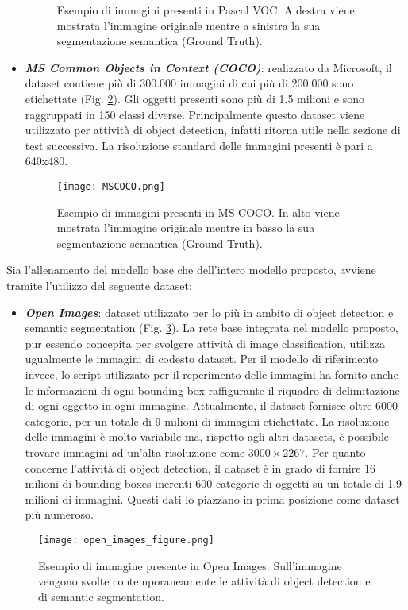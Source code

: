 \begin{itemize}
\begin{figure}
        \caption{Esempio di immagini presenti in Pascal VOC. A destra viene mostrata l'immagine originale mentre a sinistra la sua segmentazione semantica (Ground Truth).}
        \label{pascal}
    \end{figure} 
    \item {\bfseries{\emph{MS Common Objects in Context (COCO)}}}\cite{COCO}: realizzato da 
    Microsoft, il dataset contiene più di 300.000 immagini di cui più di 
    200.000 sono etichettate (Fig. \ref{MSCOCO_dataset}). Gli oggetti presenti sono più di 
    1.5 milioni e sono raggruppati in 150 classi diverse. Principalmente 
    questo dataset viene utilizzato per attività di object detection, infatti 
    ritorna utile nella sezione di test successiva. La risoluzione standard 
    delle immagini presenti è pari a 640x480.
    \begin{figure}
        \centering
        \texttt{[image: MSCOCO.png]}
        \centering
        \caption{Esempio di immagini presenti in MS COCO. In alto viene mostrata l'immagine originale mentre in basso la sua segmentazione semantica (Ground Truth).}
        \label{MSCOCO_dataset}
    \end{figure} 
\end{itemize}
Sia l'allenamento del modello base che dell'intero modello proposto, avviene 
tramite l'utilizzo del seguente dataset:
\begin{itemize}
    \item {\bfseries{\emph{Open Images}}}\cite{OpenImages2}: dataset utilizzato per lo più in ambito di object 
    detection e semantic segmentation (Fig. \ref{openimages_dataset}). La rete base integrata 
    nel modello proposto, pur essendo concepita per svolgere attività 
    di image classification, utilizza ugualmente le immagini di codesto 
    dataset. Per il modello di riferimento invece, lo script utilizzato per il 
    reperimento delle immagini ha fornito anche le informazioni di ogni 
    bounding-box raffigurante il riquadro di delimitazione di ogni oggetto 
    in ogni immagine. Attualmente, il dataset fornisce oltre 6000 categorie, 
    per un totale di 9 milioni di immagini etichettate. La risoluzione delle 
    immagini è molto variabile ma, rispetto agli altri datasets, è possibile 
    trovare immagini ad un'alta risoluzione come $3000\times{2267}$. Per quanto 
    concerne l'attività di object detection, il dataset è in grado di fornire 
    16 milioni di bounding-boxes inerenti 600 categorie di oggetti su un 
    totale di 1.9 milioni di immagini. Questi dati lo piazzano in prima 
    posizione come dataset più numeroso. 
\end{itemize}
\begin{figure}
    \centering
    \texttt{[image: open\_images\_figure.png]}
    \centering
    \caption{Esempio di immagine presente in Open Images. Sull'immagine vengono svolte contemporaneamente le attività di object detection e di semantic segmentation.}
    \label{openimages_dataset}
\end{figure}


